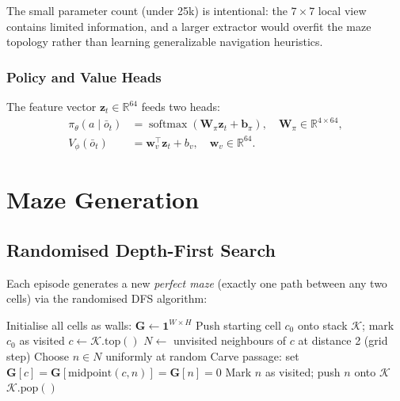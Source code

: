 \documentclass[11pt,a4paper]{article}
\newcommand{\R}{\mathbb{R}}
\newcommand{\policy}{\pi}
\newcommand{\softmax}{\operatorname{softmax}}
\begin{document}
The small parameter count (under 25k) is intentional:
the $7\times7$ local view contains limited information,
and a larger extractor would overfit the maze topology rather than
learning generalizable navigation heuristics.

\subsubsection{Policy and Value Heads}

The feature vector $\mathbf{z}_t \in \R^{64}$ feeds two heads:
\begin{align}
  \policy_\theta(a \mid \bar{o}_t) &= \softmax\!\left(\mathbf{W}_\pi \mathbf{z}_t + \mathbf{b}_\pi\right),
    \quad \mathbf{W}_\pi \in \R^{4 \times 64}, \\
  V_\phi(\bar{o}_t) &= \mathbf{w}_v^\top \mathbf{z}_t + b_v,
    \quad \mathbf{w}_v \in \R^{64}.
\end{align}

\section{Maze Generation}

\subsection{Randomised Depth-First Search}

Each episode generates a new \emph{perfect maze} (exactly one path between
any two cells) via the randomised DFS algorithm:

\begin{algorithm}[H]
\caption{Randomised DFS Maze Generation}
\label{alg:dfs}
\begin{algorithmic}[1]
\State Initialise all cells as walls: $\mathbf{G} \leftarrow \mathbf{1}^{W \times H}$
\State Push starting cell $c_0$ onto stack $\mathcal{K}$; mark $c_0$ as visited
  \State $c \leftarrow \mathcal{K}.\text{top}()$
  \State $N \leftarrow$ unvisited neighbours of $c$ at distance 2 (grid step)
    \State Choose $n \in N$ uniformly at random
    \State Carve passage: set $\mathbf{G}[c] = \mathbf{G}[\text{midpoint}(c,n)] = \mathbf{G}[n] = 0$
    \State Mark $n$ as visited; push $n$ onto $\mathcal{K}$
  \Else
    \State $\mathcal{K}.\text{pop}()$
  \EndIf
\EndWhile
\end{algorithmic}
\end{algorithm}
\end{document}
